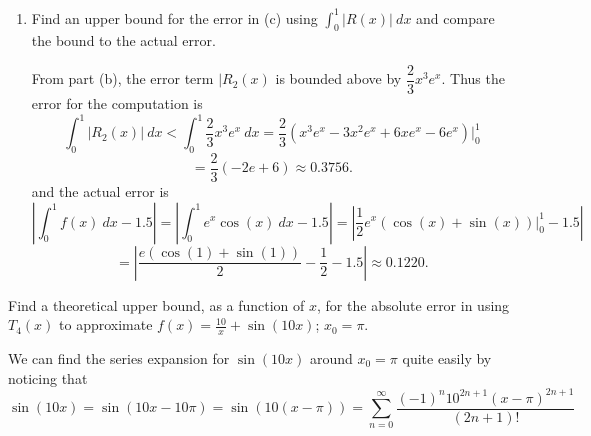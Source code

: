 \documentclass{article}
\theoremstyle{plain} %
\numberwithin{thm}{section} %
\theoremstyle{definition}
\begin{document}
\begin{question}{3}
\begin{enumerate}[label=(\alph*)]
            \item Find an upper bound for the error in (c) using \(\int _0^1 |R(x)|\ dx\) and compare the bound to the actual error.
            
            From part (b), the error term \(|R_2(x)\) is bounded above by \(\dfrac{2}{3}x^3 e^x\). Thus the error for the computation is
            \[
                \int _0^1 |R_2(x)|\ dx < \int _0^1 \dfrac{2}{3}x^3 e^x\ dx = \frac{2}{3}\left( x^3e^x - 3x^2e^x + 6xe^x - 6e^x \right) \Big|_0^1
            \]
            \[
                = \frac{2}{3}(-2e + 6) \approx 0.3756.
            \]
            and the actual error is
            \[
                \left\vert \int _0^1 f(x)\ dx - 1.5 \right\vert = \left\vert \int _0^1 e^x \cos (x)\ dx - 1.5 \right\vert = \left\vert \frac{1}{2}e^x(\cos (x) + \sin (x))\Big|_0^1 - 1.5 \right\vert
            \]
            \[
                = \left\vert \frac{e(\cos (1) + \sin (1))}{2} - \frac{1}{2} - 1.5 \right\vert \approx 0.1220.
            \]
        \end{enumerate}
    \end{question}
    \newpage
    \begin{question}{4}
        Find a theoretical upper bound, as a function of \(x\), for the absolute error in using \(T_4(x)\) to approximate \(f(x) = \frac{10}{x} + \sin(10x)\); \(x_0 = \pi\).

        We can find the series expansion for \(\sin (10x)\) around \(x_0 = \pi\) quite easily by noticing that
        \[
            \sin (10x) = \sin (10x - 10\pi) = \sin (10(x - \pi)) = \sum_{n=0}^{\infty} \frac{(-1)^n 10^{2n + 1}(x - \pi)^{2n + 1}}{(2n + 1 )!}
        \]
    \end{question}
    \newpage
\end{document}
